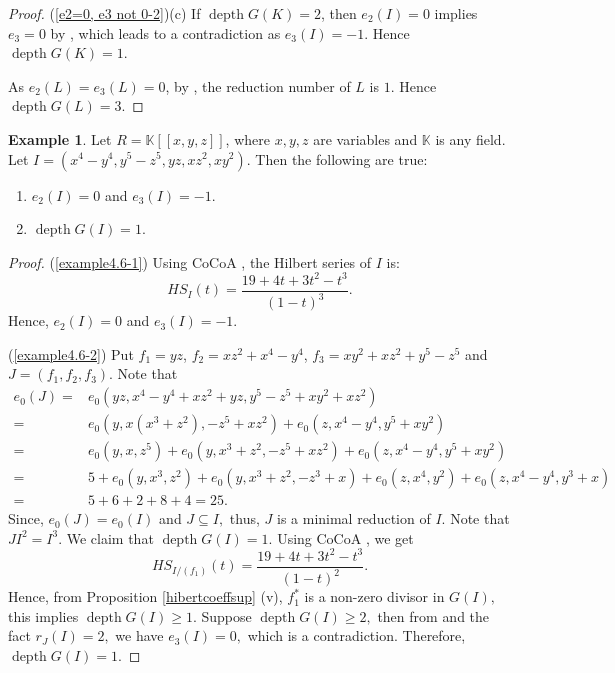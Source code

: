 \documentclass[reqno,a4paper,dvipsnames]{amsart}
\newcommand{\kk}{\mathbb{K}}
\newcommand{\depth}{\operatorname{depth}}
\theoremstyle{definition}
\newtheorem{example}[theorem]{Example}
\begin{document}
\begin{proof}
 (\ref{e2=0, e3 not 0-2})(c)
 If $\depth G(K)=2$, then  $e_2(I)=0$ implies  $e_3=0$   by \cite[Corollay~2(2)]{marley}, which leads to a contradiction as $e_3(I) =-1$. Hence $\depth G(K)=1$. 

As $e_2(L)=e_3(L)=0$,   by \cite[Theorem~2.1]{huneke}, the reduction number of $L$ is $1$.  Hence $\depth G(L)=3$.
  \end{proof}

  
\begin{example}  \label{example4.6}
Let  $R =\kk [[x,y,z]]$, where $x,y,z$ are variables and $\mathbb K$ is any field.
  Let $I =  (x^4-y^4,  y^{5}-z^{5}, yz, xz^2, xy^2)$. Then the following are true:
   \begin{enumerate} [\normalfont(i)]
    
     \item  \label{example4.6-1}
      $e_2(I) = 0$ and $e_3(I) =-1$. 
       \item \label{example4.6-2}
       $\depth G(I) = 1$.  
  \end{enumerate}
\end{example}
\begin{proof}  (\ref{example4.6-1}) Using CoCoA \cite{cocoa}, the Hilbert series of $I$ is:
\begin{equation*}
    HS_{I}(t)=\frac{19 + 4t + 3t^2 - t^3}{(1-t)^3}.
\end{equation*}
Hence, $e_{2}(I)=0$ and $e_{3}(I)=-1.$

 
 (\ref{example4.6-2})
 Put $f_1=yz$, $f_2 = xz^2+x^4-y^4$, $f_3=xy^2+xz^2+y^5-z^5$ and   $J = (f_1, f_2, f_3)$. 
 Note that 
  \begin{align*}
\label{ex 1.5 min red} \nonumber
 e_{0}(J) =& e_{0}(yz, x^4-y^4 + xz^2 + yz, y^{5}-z^{5} + xy^2 + xz^2)\\ \nonumber
 =& e_{0}(y, x(x^{3} + z^2), -z^{5} + xz^2)  
 + e_{0}(z, x^4-y^4,  y^{5} + xy^2)\\ \nonumber
=& e_{0}(y, x, z^{5})+  e_{0}(y, x^{3} + z^2,-z^{5} + xz^2 )  
+ e_{0}(z, x^4-y^4, y^{5} + xy^2)\\ \nonumber
=& 5 + e_{0}(y, x^{3},z^2 ) + e_{0}(y, x^{3} + z^2,-z^{3} + x ) 
+  e_{0}(z, x^4, y^2) +  e_{0}(z, x^4-y^4, y^{3} + x)\\
=& 5 + 6 + 2 + 8 + 4 = 25.
\end{align*}
Since, $e_{0}(J)=e_{0}(I)$ and $J\subseteq I,$ thus, $J$ is a minimal reduction of $I.$ Note that $JI^{2}=I^{3}.$ We claim that $\depth G(I)=1.$  Using CoCoA \cite{cocoa}, we get
$$HS_{I/(f_{1})}(t)=\frac{19 + 4t + 3t^2 - t^3}{(1-t)^2}.$$ Hence, from Proposition \ref{hibertcoeffsup} (v), $f_{1}^*$ is a non-zero divisor in $G(I),$ this implies $\depth G(I) \geq 1.$ Suppose $\depth G(I)\geq 2,$ then from \cite[Theorem 2.5]{rv} and the fact $r_{J}(I)=2,$ we have $e_{3}(I)=0,$ which is a contradiction. Therefore, $\depth G(I)=1.$
\end{proof}
\end{document}
